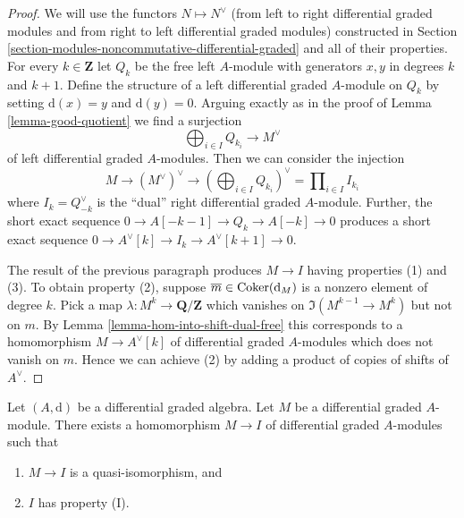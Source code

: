 \begin{proof}
We will use the functors $N \mapsto N^\vee$ (from left to right
differential graded modules and from right to left differential
graded modules) constructed in
Section \ref{section-modules-noncommutative-differential-graded}
and all of their properties.
For every $k \in \mathbf{Z}$ let $Q_k$ be the free left $A$-module with
generators $x, y$ in degrees $k$ and $k + 1$. Define the structure of a
left differential graded $A$-module on $Q_k$ by setting $\text{d}(x) = y$
and $\text{d}(y) = 0$. Arguing exactly as in the proof of
Lemma \ref{lemma-good-quotient} we find a surjection
$$
\bigoplus\nolimits_{i \in I} Q_{k_i} \longrightarrow M^\vee
$$
of left differential graded $A$-modules. Then we can consider the injection
$$
M \to (M^\vee)^\vee \to (\bigoplus\nolimits_{i \in I} Q_{k_i})^\vee =
\prod\nolimits_{i \in I} I_{k_i}
$$
where $I_k = Q_{-k}^\vee$ is the ``dual'' right differential graded $A$-module.
Further, the short exact sequence $0 \to A[-k - 1] \to Q_k \to A[-k] \to 0$
produces a short exact sequence
$0 \to A^\vee[k] \to I_k \to A^\vee[k + 1] \to 0$.

\medskip\noindent
The result of the previous paragraph produces $M \to I$
having properties (1) and (3). To obtain property (2), suppose
$\overline{m} \in \mathop{\mathrm{Coker}}(\text{d}_M)$ is a nonzero element of
degree $k$. Pick a map $\lambda : M^k \to \mathbf{Q}/\mathbf{Z}$
which vanishes on $\Im(M^{k - 1} \to M^k)$ but not on $m$. By
Lemma \ref{lemma-hom-into-shift-dual-free}
this corresponds to a homomorphism $M \to A^\vee[k]$ of
differential graded $A$-modules which does not vanish on $m$.
Hence we can achieve (2) by adding
a product of copies of shifts of $A^\vee$.
\end{proof}

\begin{lemma}
\label{lemma-right-resolution}
Let $(A, \text{d})$ be a differential graded algebra.
Let $M$ be a differential graded $A$-module. There exists a homomorphism
$M \to I$ of differential graded $A$-modules such that
\begin{enumerate}
\item $M \to I$ is a quasi-isomorphism, and
\item $I$ has property (I).
\end{enumerate}
\end{lemma}

